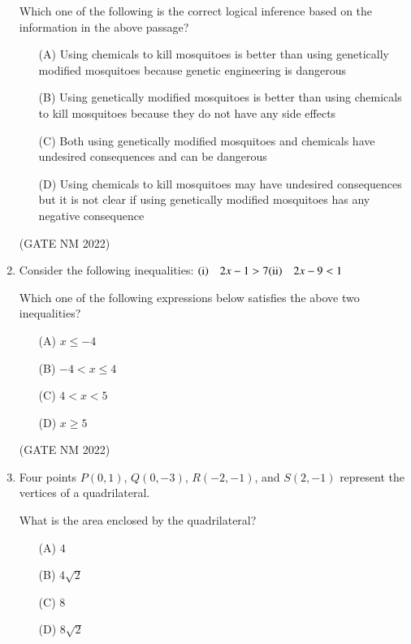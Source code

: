 \documentclass[journal,12pt,onecolumn]{IEEEtran}
\theoremstyle{remark}
\begin{document}
\begin{enumerate}
Which one of the following is the correct logical inference based on the information in the above passage?  

\begin{enumerate}
    \item[(A)] Using chemicals to kill mosquitoes is better than using genetically modified mosquitoes because genetic engineering is dangerous
    \item[(B)] Using genetically modified mosquitoes is better than using chemicals to kill mosquitoes because they do not have any side effects
    \item[(C)] Both using genetically modified mosquitoes and chemicals have undesired consequences and can be dangerous
    \item[(D)] Using chemicals to kill mosquitoes may have undesired consequences but it is not clear if using genetically modified mosquitoes has any negative consequence
\end{enumerate}

\hfill(GATE NM 2022)



\item  Consider the following inequalities:  
$	
    \text{(i)} \quad   2x - 1 > 7 \\
 \text{(ii)} \quad   2x - 9 < 1
$

Which one of the following expressions below satisfies the above two inequalities?  

\begin{enumerate}
    \item[(A)] $x \leq -4$
    \item[(B)] $-4 < x \leq 4$
    \item[(C)] $4 < x < 5$
    \item[(D)] $x \geq 5$
\end{enumerate}

\hfill(GATE NM 2022)



\item  Four points $P(0, 1)$, $Q(0, -3)$, $R(-2, -1)$, and $S(2, -1)$ represent the vertices of a quadrilateral.  

What is the area enclosed by the quadrilateral?  

\begin{enumerate}
    \item[(A)] $4$
    \item[(B)] $4\sqrt{2}$
    \item[(C)] $8$
    \item[(D)] $8\sqrt{2}$
\end{enumerate}


\end{enumerate}
\end{document}
